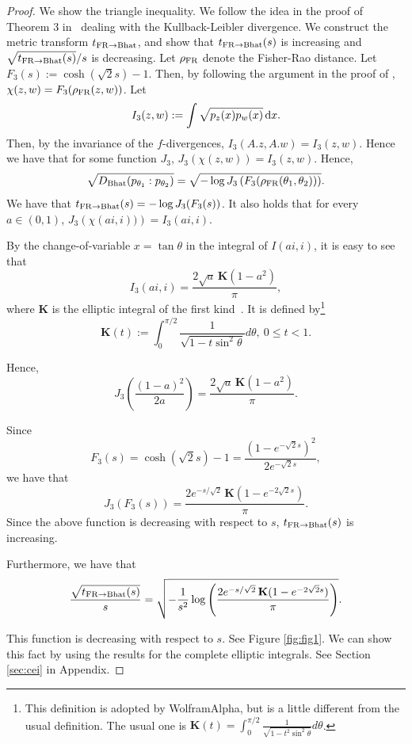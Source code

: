 \documentclass[journal]{IEEEtran}
\begin{document}
\begin{proof}
We show the triangle inequality. 
We follow the idea in the proof of Theorem 3 in~\cite{CauchyVoronoi-2020} dealing with the Kullback-Leibler divergence. 
We construct the metric transform $t_{\mathrm{FR} \rightarrow \mathrm{Bhat}}$, and show that $t_{\mathrm{FR}\rightarrow \mathrm{Bhat}}(s)$ is increasing and $\sqrt{t_{\mathrm{FR} \rightarrow \mathrm{Bhat}}(s)}/s$ is decreasing.  
Let $\rho_{\mathrm{FR}}$ denote the Fisher-Rao distance. 
Let $F_3(s) := \cosh(\sqrt{2} s) -1$. 
Then, by following the argument in the proof of   \cite[Theorem 3]{CauchyVoronoi-2020}, 
$\chi(z,w) = F_3(\rho_{\mathrm{FR}}(z,w))$.  
Let 
\[ I_3(z,w) := \int \sqrt{p_z (x) p_w(x)}\, \mathrm{d}x. \]
Then, by the invariance of the $f$-divergences, 
$I_3(A.z, A.w) = I_3(z,w)$.
Hence we have that for some function $J_3$, $J_3(\chi(z,w)) = I_3(z,w)$. 
Hence, 
\[ \sqrt{D_{\mathrm{Bhat}}(p_{\theta_1}:p_{\theta_2})} = \sqrt{-\log J_3\left(F_3(\rho_{\mathrm{FR}}(\theta_1, \theta_2))\right)}. \]
We have that 
$t_{\mathrm{FR} \rightarrow \mathrm{Bhat}}(s) = -\log J_3(F_3(s))$. 
It also holds that for every $a \in (0,1)$, $J_3\left( \chi(ai,i)) \right) = I_3(ai,i)$.

By the change-of-variable $x = \tan \theta$ in the integral of $I(a i, i)$, 
it is easy to see that 
\[ I_3(ai,i) = \dfrac{2 \sqrt{a}\, \mathbf{K}(1-a^2)}{\pi},\] 
where $\mathbf{K}$ is the elliptic integral of the first kind~\cite{Carlson1985}. 
It is defined by\footnote{This definition is adopted by WolframAlpha, but is a little different from the usual definition. The usual one is $\mathbf{K}(t) = \int_0^{\pi/2} \frac{1}{\sqrt{1 - t^2 \sin^2 \theta}} d\theta$.} 
\[ \mathbf{K}(t) := \int_0^{\pi/2} \frac{1}{\sqrt{1 - t \sin^2 \theta}} d\theta, \ 0 \le t < 1. \]


Hence, 
\[ J_3 \left(\frac{(1-a)^2}{2a}\right) = \frac{2 \sqrt{a}\, \mathbf{K}(1-a^2)}{\pi}. \]


Since $$F_3(s) = \cosh(\sqrt{2} s) -1 = \frac{(1 - e^{-\sqrt{2} s})^2}{2 e^{-\sqrt{2} s}}, $$
we have that 
\[ J_3(F_3(s)) = \frac{2 e^{-s/\sqrt{2}}\, \mathbf{K}(1-e^{-2\sqrt{2} s})}{\pi}. \]
Since the above function is decreasing with respect to $s$, 
$t_{\mathrm{FR} \rightarrow \mathrm{Bhat}}(s)$ is increasing. 

Furthermore, we have that 
\begin{equation}\label{eq:sqrt-Bhat} 
\frac{\sqrt{t_{\FR \rightarrow \Bhat}(s)}}{s} = \sqrt{{-\frac{1}{s^2}}\log \left(  \frac{2 e^{-s/\sqrt{2}}\, \mathbf{K}(1-e^{-2\sqrt{2} s})}{\pi} \right) }. 
\end{equation}

This function is decreasing with respect to $s$. 
See Figure \ref{fig:fig1}. 
We can show this fact by using the results for the complete elliptic integrals. 
See Section \ref{sec:cei} in Appendix.
\end{proof}
\end{document}
